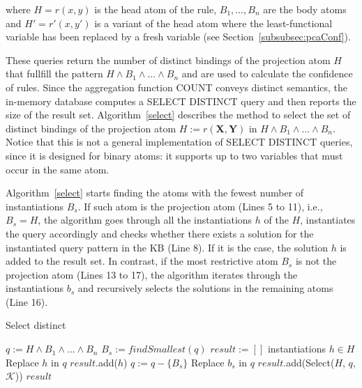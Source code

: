 \noindent where $H = r(x,y)$ is the head atom of the rule, $B_1, \dots, B_n$ are the body atoms and $H'= r'(x,y')$ is a variant of the
head atom where the least-functional variable has been replaced by a fresh variable (see Section~\ref{subsubsec:pcaConf}).

These queries return the number of distinct bindings of the projection atom $H$ 
that fullfill the pattern $H \wedge B_1 \wedge ... \wedge B_n$ and are used to
calculate the confidence of rules. Since the aggregation function COUNT conveys
distinct semantics, the in-memory database computes a SELECT DISTINCT query 
and then reports the size of the result set. Algorithm~\ref{select} describes
the method to select the set of distinct bindings of the projection atom $H := r(\bm{X}, \bm{Y})$ in
$H \wedge B_1 \wedge ... \wedge B_n$. Notice that this is not a general implementation of SELECT DISTINCT queries,
since it is designed for binary atoms: it supports up to two variables that must occur in the same atom.

Algorithm~\ref{select} starts finding the atoms with the fewest number of instantiations $B_s$. If such atom is the
projection atom (Lines 5 to 11), i.e., $B_s = H$, the algorithm goes through all the instantiations $h$ of the $H$, instantiates
the query accordingly and checks whether there exists a solution for the instantiated query pattern in the KB (Line 8). 
If it is the case, the solution $h$ is added to the result set. In contrast, if the most restrictive atom $B_s$ is not 
the projection atom (Lines 13 to 17), the algorithm iterates through the instantiations $b_s$ and recursively 
selects the solutions in the remaining atoms (Line 16).

\begin{algorithm}
\caption{Select distinct}
\label{select}
\begin{algorithmic}[1]
    \State $q := H \wedge B_1 \wedge ... \wedge B_n$
    \State $B_s := findSmallest(q)$
    \State $result := [ ]$
      \ForAll instantiations $h \in H$
	\State Replace $h$ in $q$
	  \State $result$.add($h$)
	\EndIf
      \EndFor
    \Else
      \State $q := q - \{ B_s\}$
      	\State Replace $b_s$ in $q$
      	\State $result$.add(Select($H$, $q$, $\mathcal{K}$))
      \EndFor
    \EndIf
    \State \Return $result$
\EndFunction
\end{algorithmic}
\end{algorithm}




